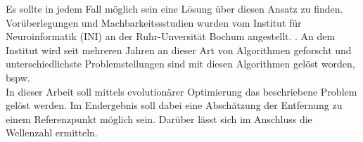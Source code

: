 Es sollte in jedem Fall möglich sein eine Lösung über diesen Ansatz zu finden. Vorüberlegungen und Machbarkeitssstudien wurden vom Institut für Neuroinformatik (INI) an der Ruhr-Unversität Bochum angestellt. \cite{Wil1,Muz1}. An dem Institut wird seit mehreren Jahren an dieser Art von Algorithmen geforscht und unterschiedlichste Problemstellungen sind mit diesen Algorithmen gelöst worden, bspw.~\cite{DBLP:conf/bildmed/RitschelDW12, DBLP:conf/bildmed/WinterRBD10}\\
%

In dieser Arbeit soll mittels evolutionärer Optimierung das beschriebene Problem gelöst werden. Im Endergebnis soll dabei eine Abschätzung der Entfernung zu einem Referenzpunkt möglich sein. Darüber lässt sich im Anschluss die Wellenzahl ermitteln.
